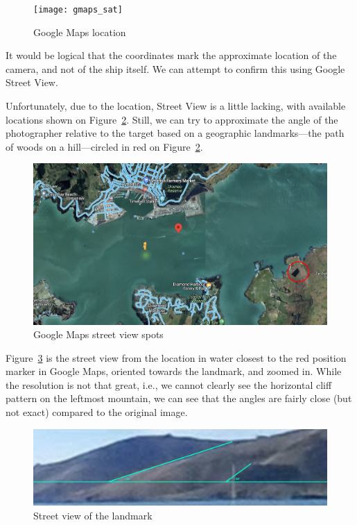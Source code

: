 \documentclass[parskip=half]{scrartcl}
\newcommand\figref{Figure~\ref}
\begin{document}
\begin{figure}[ht]
    \texttt{[image: gmaps\_sat]}
    \centering
    \caption{Google Maps location}
    \label{fig:gmaps_sat}
\end{figure}

It would be logical that the coordinates mark the approximate location of the
camera, and not of the ship itself. We can attempt to confirm this using Google
Street View.

Unfortunately, due to the location, Street View is a little lacking, with
available locations shown on \figref{fig:streetview_spots}. Still, we can try to
approximate the angle of the photographer relative to the target based on a
geographic landmarks---the path of woods on a hill---circled in red on
\figref{fig:streetview_spots}.

\begin{figure}[ht]
    \includegraphics[width=\textwidth]{maps1-marked}
    \centering
    \caption{Google Maps street view spots}
    \label{fig:streetview_spots}
\end{figure}

\figref{fig:streetview_anno1} is the street view from the location in water
closest to the red position marker in Google Maps, oriented towards the
landmark, and zoomed in. While the resolution is not that great, i.e., we cannot
clearly see the horizontal cliff pattern on the leftmost mountain, we can see
that the angles are fairly close (but not exact) compared to the original image.

\begin{figure}[ht]
    \includegraphics[width=\textwidth]{sv_ss1_annotated}
    \centering
    \caption{Street view of the landmark}
    \label{fig:streetview_anno1}
\end{figure}
\end{document}
